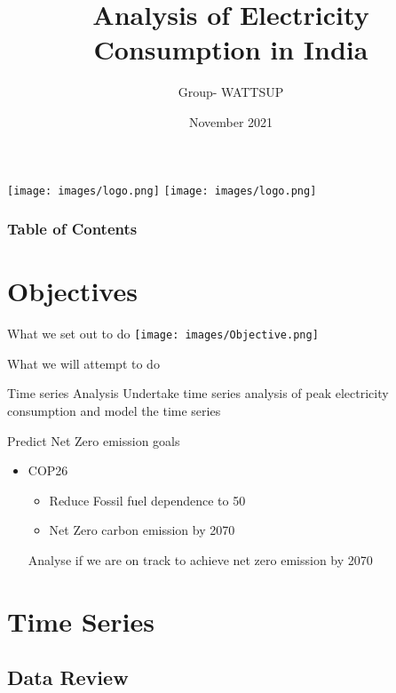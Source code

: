 \documentclass{beamer}
\title{Analysis of Electricity Consumption in India}
\author{Group- WATTSUP}
\date{November 2021}
\begin{document}
\begin{frame}
\centering
\texttt{[image: images/logo.png]}
\texttt{[image: images/logo.png]}
\titlepage
\end{frame}
\begin{frame}
\frametitle{Table of Contents}
\tableofcontents
\end{frame}

\section{Objectives}
\begin{frame}{What we set out to do}
\centering
\texttt{[image: images/Objective.png]}
\end{frame}


\begin{frame}{What we will attempt to do}
\begin{block}{Time series Analysis}
    Undertake time series analysis of peak electricity consumption and model the time series      
\end{block}
\begin{block}{Predict Net Zero emission goals}
    \begin{itemize}
        \item COP26
        \begin{itemize}
            \item Reduce Fossil fuel dependence to 50%
            \item Net Zero carbon emission by 2070
        \end{itemize}
        Analyse if we are on track to achieve net zero emission by 2070
    \end{itemize}

\end{block}

\end{frame}

\section{Time Series}
\subsection{Data Review}
\end{document}

